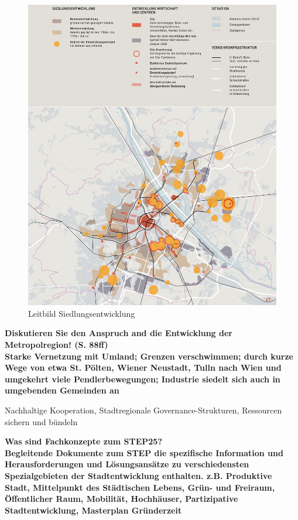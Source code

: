 \documentclass[]{article}
\newenvironment{question}{\vspace{8mm}\noindent\bfseries}{\\}
\begin{document}
\begin{figure}
	\centering
	\includegraphics[width=0.9\linewidth]{images/leitbild_siedlungsentwicklung}
	\caption{Leitbild Siedlungsentwicklung}
	\label{fig:leitbildsiedlungsentwicklung}
\end{figure}


\begin{question}
	Diskutieren Sie den Anspruch and die Entwicklung der Metropolregion! (S. 88ff)
\end{question}
Starke Vernetzung mit Umland; Grenzen verschwimmen; durch kurze Wege von etwa St. Pölten, Wiener Neustadt, Tulln nach Wien und umgekehrt viele Pendlerbewegungen; Industrie siedelt sich auch in umgebenden Gemeinden an

Nachhaltige Kooperation, Stadtregionale Governance-Strukturen, Ressourcen sichern und bündeln

\begin{question}
	Was sind Fachkonzepte zum STEP25?
\end{question}
Begleitende Dokumente zum STEP die spezifische Information und Herausforderungen und Lösungsansätze zu verschiedensten Spezialgebieten der Stadtentwicklung enthalten. z.B. Produktive Stadt, Mittelpunkt des Städtischen Lebens, Grün- und Freiraum, Öffentlicher Raum, Mobilität, Hochhäuser, Partizipative Stadtentwicklung, Masterplan Gründerzeit
\end{document}
